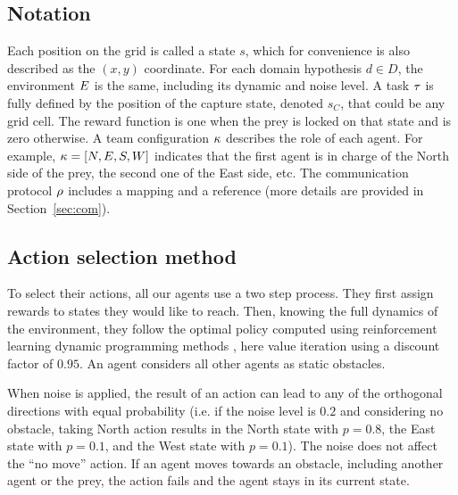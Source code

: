 \subsection{Notation}

Each position on the grid is called a state $s$, which for convenience is also described as the $(x,y)$ coordinate. For each domain hypothesis $d \in D$, the environment $E$ is the same, including its dynamic and noise level. A task $\tau$ is fully defined by the position of the capture state, denoted $s_C$, that could be any grid cell. The reward function is one when the prey is locked on that state and is zero otherwise. A team configuration $\kappa$ describes the role of each agent. For example, $\kappa = [N,E,S,W]$ indicates that the first agent is in charge of the North side of the prey, the second one of the East side, etc. The communication protocol $\rho$ includes a mapping and a reference (more details are provided in Section~\ref{sec:com}).

\subsection{Action selection method}

To select their actions, all our agents use a two step process. They first assign rewards to states they would like to reach. Then, knowing the full dynamics of the environment, they follow the optimal policy computed using reinforcement learning dynamic programming methods \cite{sutton1998reinforcement}, here value iteration using a discount factor of $0.95$. An agent considers all other agents as static obstacles. %

When noise is applied, the result of an action can lead to any of the orthogonal directions with equal probability (i.e. if the noise level is $0.2$ and considering no obstacle, taking North action results in the North state with $p=0.8$, the East state with $p=0.1$, and the West state with $p=0.1$). The noise does not affect the ``no move'' action. If an agent moves towards an obstacle, including another agent or the prey, the action fails and the agent stays in its current state.

